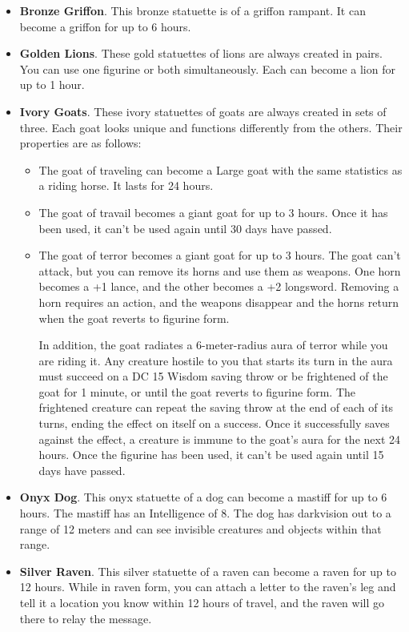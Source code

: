         \begin{itemize}
            \item \textbf{Bronze Griffon}.
            This bronze statuette is of a griffon rampant.
            It can become a griffon for up to 6 hours.
            \item \textbf{Golden Lions}.
            These gold statuettes of lions are always created in pairs.
            You can use one figurine or both simultaneously.
            Each can become a lion for up to 1 hour.
            \item \textbf{Ivory Goats}.
            These ivory statuettes of goats are always created in sets of three.
            Each goat looks unique and functions differently from the others.
            Their properties are as follows:
            \begin{itemize}
                \item The goat of traveling can become a Large goat with the same statistics as a riding horse.
                It lasts for 24 hours.
                \item The goat of travail becomes a giant goat for up to 3 hours.
                Once it has been used, it can't be used again until 30 days have passed.
                \item The goat of terror becomes a giant goat for up to 3 hours.
                The goat can't attack, but you can remove its horns and use them as weapons.
                One horn becomes a +1 lance, and the other becomes a +2 longsword.
                Removing a horn requires an action, and the weapons disappear and the horns return when the goat reverts to figurine form.

                In addition, the goat radiates a 6-meter-radius aura of terror while you are riding it.
                Any creature hostile to you that starts its turn in the aura must succeed on a DC 15 Wisdom saving throw or be frightened of the goat for 1 minute, or until the goat reverts to figurine form.
                The frightened creature can repeat the saving throw at the end of each of its turns, ending the effect on itself on a success. Once it successfully saves against the effect, a creature is immune to the goat's aura for the next 24 hours.
                Once the figurine has been used, it can't be used again until 15 days have passed.
            \end{itemize}
            \item \textbf{Onyx Dog}.
            This onyx statuette of a dog can become a mastiff for up to 6 hours.
            The mastiff has an Intelligence of 8.
            The dog has darkvision out to a range of 12 meters and can see invisible creatures and objects within that range.
            \item \textbf{Silver Raven}.
            This silver statuette of a raven can become a raven for up to 12 hours.
            While in raven form, you can attach a letter to the raven's leg and tell it a location you know within 12 hours of travel, and the raven will go there to relay the message.
        \end{itemize}
